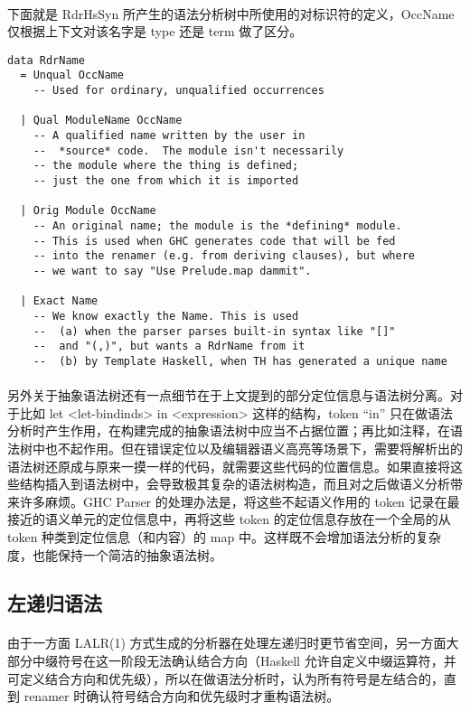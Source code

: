 \documentclass{article}
\begin{document}
 	\paragraph{}
 	下面就是 RdrHsSyn 所产生的语法分析树中所使用的对标识符的定义，OccName 仅根据上下文对该名字是 type 还是 term 做了区分。
 	\begin{verbatim}
data RdrName 
  = Unqual OccName
    -- Used for ordinary, unqualified occurrences 
 	
  | Qual ModuleName OccName
    -- A qualified name written by the user in 
    --  *source* code.  The module isn't necessarily 
    -- the module where the thing is defined; 
    -- just the one from which it is imported
 	
  | Orig Module OccName
    -- An original name; the module is the *defining* module.
    -- This is used when GHC generates code that will be fed
    -- into the renamer (e.g. from deriving clauses), but where
    -- we want to say "Use Prelude.map dammit".  
 	
  | Exact Name
    -- We know exactly the Name. This is used 
    --  (a) when the parser parses built-in syntax like "[]" 
    --  and "(,)", but wants a RdrName from it
    --  (b) by Template Haskell, when TH has generated a unique name
 	\end{verbatim}
 	\paragraph{}
 	另外关于抽象语法树还有一点细节在于上文提到的部分定位信息与语法树分离。对于比如 let <let-bindinds> in <expression> 这样的结构，token “in” 只在做语法分析时产生作用，在构建完成的抽象语法树中应当不占据位置；再比如注释，在语法树中也不起作用。但在错误定位以及编辑器语义高亮等场景下，需要将解析出的语法树还原成与原来一摸一样的代码，就需要这些代码的位置信息。如果直接将这些结构插入到语法树中，会导致极其复杂的语法树构造，而且对之后做语义分析带来许多麻烦。GHC Parser 的处理办法是，将这些不起语义作用的 token 记录在最接近的语义单元的定位信息中，再将这些 token 的定位信息存放在一个全局的从 token 种类到定位信息（和内容）的 map 中。这样既不会增加语法分析的复杂度，也能保持一个简洁的抽象语法树。
	\subsection{左递归语法}
	\paragraph{}
	由于一方面 LALR(1) 方式生成的分析器在处理左递归时更节省空间，另一方面大部分中缀符号在这一阶段无法确认结合方向（Haskell 允许自定义中缀运算符，并可定义结合方向和优先级），所以在做语法分析时，认为所有符号是左结合的，直到 renamer 时确认符号结合方向和优先级时才重构语法树。
\end{document}
